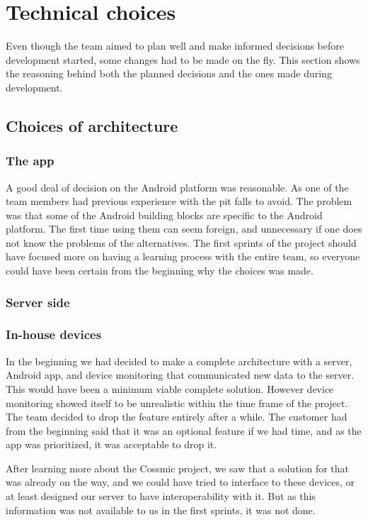 \section{Technical choices}
Even though the team aimed to plan well and make informed decisions before development started, some changes had to be made on the fly. This section shows the reasoning behind both the planned decisions and the ones made during development.

\subsection{Choices of architecture}
\subsubsection{The app}
A good deal of decision on the Android platform was reasonable. As one of the team members had previous experience with the pit falls to avoid. The problem was that some of the Android building blocks are specific to the Android platform. The first time using them can seem foreign, and unnecessary if one does not know the problems of the alternatives. The first sprints of the project should have focused more on having a learning process with the entire team, so everyone could have been certain from the beginning why the choices was made.

\subsubsection{Server side}

\subsubsection{In-house devices}
In the beginning we had decided to make a complete architecture with a server, Android app, and device monitoring that communicated new data to the server. This would have been a minimum viable complete solution. However device monitoring showed itself to be unrealistic within the time frame of the project. The team decided to drop the feature entirely after a while. The customer had from the beginning said that it was an optional feature if we had time, and as the app was prioritized, it was acceptable to drop it.

After learning more about the Cossmic project, we saw that a solution for that was already on the way, and we could have tried to interface to these devices, or at least designed our server to have interoperability with it. But as this information was not available to us in the first sprints, it was not done. 

